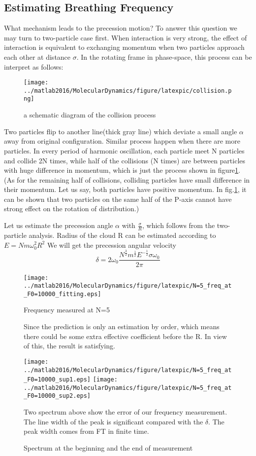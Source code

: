 \documentclass[a4paper,onecolumn,12pt]{article}
\begin{document}
\subsection{Estimating Breathing Frequency}
What mechanism leads to the precession motion? To answer this question we may turn to two-particle case first. When interaction is very strong, the effect of interaction is equivalent to exchanging momentum when two particles approach each other at distance $\sigma$. In the rotating frame in phase-space, this process can be interpret as follows:

\begin{figure}[hbtp]
\centering
\texttt{[image: ../matlab2016/MolecularDynamics/figure/latexpic/collision.png]}
\caption{a schematic diagram of the collision process}
\label{Breathingfrequency3}
\end{figure}


Two particles flip to another line(thick gray line) which deviate a small angle $\alpha$ away from original configuration. Similar process happen when there are more particles. In every period of harmonic oscillation, each particle meet N particles and collide 2N times, while half of the collisions (N times) are between particles with huge difference in momentum, which is just the process shown in figure\ref{Breathingfrequency3}. (As for the remaining half of collisions, colliding particles have small difference in their momentum. Let us say, both particles have positive momentum. In fig.\ref{Breathingfrequency3}, it can be shown that two particles on the same half of the P-axis cannot have strong effect on the rotation of distribution.)

Let us estimate the precession angle $\alpha$ with $\frac{\sigma}{R}$, which follows from the two-particle analysis. Radius of the cloud R can be estimated according to $E=Nm\omega_0^2R^2$
We will get the precession angular velocity 
\begin{equation}
\delta=2\omega_0\frac{N^\frac{3}{2}m^{\frac{1}{2}}E^{-\frac{1}{2}}\sigma\omega_0}{2\pi}
\label{eq:breathingfrequency1}
\end{equation}
\begin{figure}[hbtp]
\begin{center}
\texttt{[image: ../matlab2016/MolecularDynamics/figure/latexpic/N=5\_freq\_at\_F0=10000\_fitting.eps]}
\caption{Frequency measured at N=5} 
Since the prediction is only an estimation by order, which means there could be some extra effective coefficient before the R. In view of this, the result is satisfying.

\texttt{[image: ../matlab2016/MolecularDynamics/figure/latexpic/N=5\_freq\_at\_F0=10000\_sup1.eps]}
\texttt{[image: ../matlab2016/MolecularDynamics/figure/latexpic/N=5\_freq\_at\_F0=10000\_sup2.eps]}
\caption{Spectrum at the beginning and the end of measurement}
\end{center}
 Two spectrum above show the error of our frequency measurement. The line width of the peak is significant compared with the $\delta$. The peak width comes from FT in finite time.
\end{figure}
\end{document}
